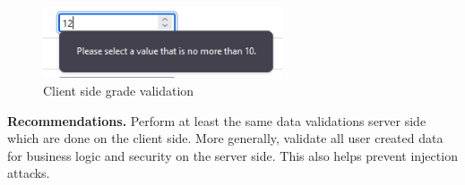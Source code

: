 \documentclass[parskip=half]{scrartcl}
\begin{document}
\begin{figure}[h]
    \centering
    \includegraphics[width=200pt]{value_bound}
    \caption{Client side grade validation}
    \label{fig:grades:bound}
\end{figure}

\textbf{Recommendations.} Perform at least the same data validations server
side which are done on the client side. More generally, validate all user
created data for business logic and security on the server side. This also
helps prevent injection attacks.
\end{document}
